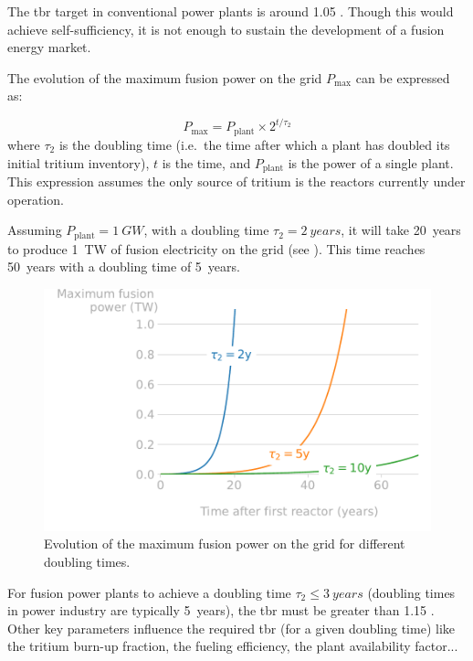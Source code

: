 The \gls{tbr} target in conventional power plants is around 1.05 .
Though this would achieve self-sufficiency, it is not enough to sustain the development of a fusion energy market.

The evolution of the maximum fusion power on the grid $P_\mathrm{max}$ can be expressed as:

\begin{equation}
    P_\mathrm{max} = P_\mathrm{plant} \times 2^{t/\tau_2}
\end{equation}
where $\tau_2$ is the doubling time (i.e.\ the time after which a plant has doubled its initial tritium \gls{inventory}), $t$ is the time, and $P_\mathrm{plant}$ is the power of a single plant.
This expression assumes the only source of tritium is the reactors currently under operation.

Assuming $P_\mathrm{plant} = \SI{1}{GW}$, with a doubling time $\tau_2 = \SI{2}{years}$, it will take \SI{20}{years} to produce \SI{1}{TW} of fusion electricity on the grid (see ).
This time reaches \SI{50}{years} with a doubling time of \SI{5}{years}.

\begin{figure}
    \centering
    \includegraphics[width=0.8\linewidth]{Figures/Chapter1/doubling_time.pdf}
    \caption{Evolution of the maximum fusion power on the grid for different doubling times.}
\end{figure}

For fusion power plants to achieve a doubling time $\tau_2 \leq \SI{3}{years}$ (doubling times in power industry are typically \SI{5}{years}), the \gls{tbr} must be greater than 1.15 .
Other key parameters influence the required \gls{tbr} (for a given doubling time) like the tritium burn-up fraction, the fueling efficiency, the plant availability factor...

